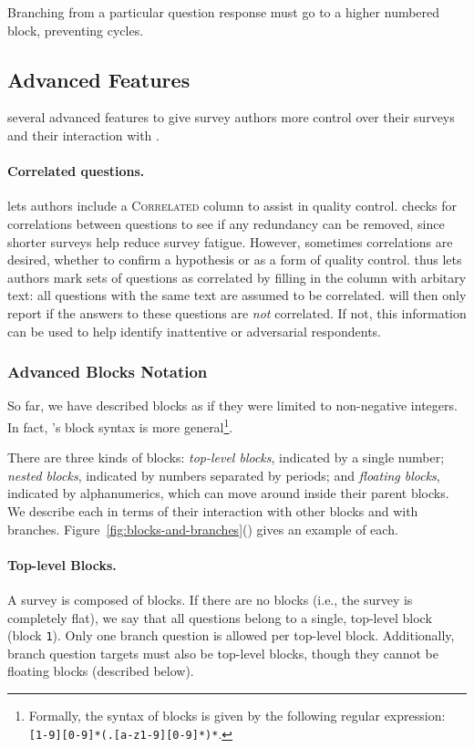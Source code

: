 Branching
from a particular question response must go to a higher numbered
block, preventing cycles.



\subsection{Advanced Features}

\surveyman{} several advanced features to give survey authors more control over their surveys and their interaction with \surveyman{}.

\paragraph{Correlated questions.}
\surveyman{} lets authors include a
\textsc{Correlated} column to assist in quality control. \surveyman{}
checks for correlations between questions to see if any redundancy can
be removed, since shorter surveys help reduce survey fatigue. However,
sometimes correlations are desired, whether to confirm a hypothesis or
as a form of quality control. \surveyman{} thus lets authors mark sets
of questions as correlated by filling in the column with arbitary
text: all questions with the same text are assumed to be
correlated. \surveyman{} will then only report if the answers to these
questions are \emph{not} correlated. If not, this information can be
used to help identify inattentive or adversarial respondents.

\subsubsection*{Advanced Blocks Notation}
\label{sec:advanced-blocks}

So far, we have described blocks as if they were limited to
non-negative integers. In fact, \surveyman{}'s block syntax is more
general\footnote{Formally, the syntax of blocks is given by the
  following regular expression:
  \texttt{[1-9][0-9]*(.[a-z1-9][0-9]*)*}.}.

There are three kinds of blocks: \emph{top-level blocks}, indicated by
a single number; \emph{nested blocks}, indicated by numbers separated
by periods; and \emph{floating blocks}, indicated by alphanumerics,
which can move around inside their parent blocks. We describe each in
terms of their interaction with other blocks and with
branches. Figure~\ref{fig:blocks-and-branches}() gives an example of each.

\paragraph{Top-level Blocks.}
A survey is composed of blocks. If there are no blocks (i.e., the
survey is completely flat), we say that all questions belong to a
single, top-level block (block \texttt{1}). Only one branch question
is allowed per top-level block. Additionally, branch question targets
must also be top-level blocks, though they cannot be floating blocks
(described below).

